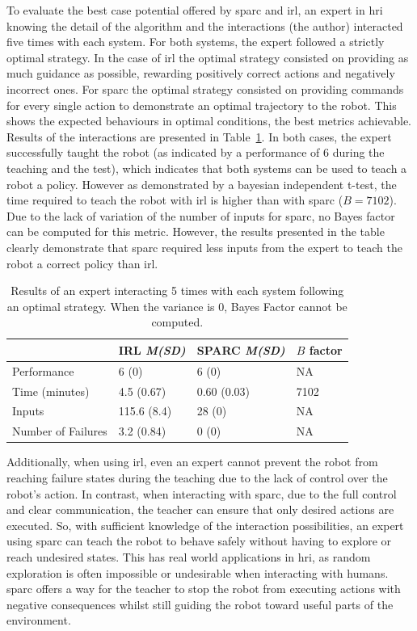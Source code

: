 To evaluate the best case potential offered by \gls{sparc} and \gls{irl}, an expert in \gls{hri} knowing the detail of the algorithm and the interactions (the author) interacted five times with each system. For both systems, the expert followed a strictly optimal strategy. In the case of \gls{irl} the optimal strategy consisted on providing as much guidance as possible, rewarding positively correct actions and negatively incorrect ones. For \gls{sparc} the optimal strategy consisted on providing commands for every single action to demonstrate an optimal trajectory to the robot. This shows the expected behaviours in optimal conditions, the best metrics achievable. Results of the interactions are presented in Table~\ref{tab:control_expert}. In both cases, the expert successfully taught the robot (as indicated by a performance of 6 during the teaching and the test), which indicates that both systems can be used to teach a robot a policy. However as demonstrated by a bayesian independent t-test, the time required to teach the robot with \gls{irl} is higher than with \gls{sparc} ($B=7102$). Due to the lack of variation of the number of inputs for \gls{sparc}, no Bayes factor can be computed for this metric. However, the results presented in the table clearly demonstrate that \gls{sparc} required less inputs from the expert to teach the robot a correct policy than \gls{irl}.

\begin{table}[ht]
	\centering
	\caption{Results of an expert interacting 5 times with each system following an optimal strategy. When the variance is 0, Bayes Factor cannot be computed.}
	\label{tab:control_expert}
	\begin{tabular}{@{}llll@{}}\toprule
		&IRL \textit{M(SD)} & SPARC \textit{M(SD)} & $B$ factor\\
		\midrule
		Performance & 6 (0) & 6 (0) & NA \\
		Time (minutes) & 4.5 (0.67) & 0.60 (0.03) & 7102 \\
		Inputs & 115.6 (8.4) & 28 (0) & NA \\
		Number of Failures & 3.2 (0.84) & 0 (0) & NA \\
		\bottomrule
	\end{tabular}
\end{table}

Additionally, when using \gls{irl}, even an expert cannot prevent the robot from reaching failure states during the teaching due to the lack of control over the robot's action. In contrast, when interacting with \gls{sparc}, due to the full control and clear communication, the teacher can ensure that only desired actions are executed. So, with sufficient knowledge of the interaction possibilities, an expert using \gls{sparc} can teach the robot to behave safely without having to explore or reach undesired states. This has real world applications in \gls{hri}, as random exploration is often impossible or undesirable when interacting with humans. \gls{sparc} offers a way for the teacher to stop the robot from executing actions with negative consequences whilst still guiding the robot toward useful parts of the environment.

